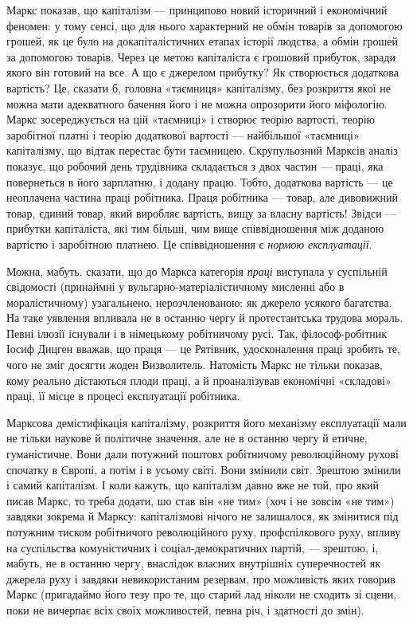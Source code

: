 Маркс показав, що капіталізм — принципово новий історичний і 
економічний феномен: у тому сенсі, що для нього характерний не обмін 
товарів за допомогою грошей, як це було на докапіталістичних етапах 
історії людства, а обмін грошей за допомогою товарів. Через це метою 
капіталіста є грошовий прибуток, заради якого він готовий на все. А що 
є джерелом прибутку? Як створюється додаткова вартість? Це, сказати б, 
головна «таємниця» капіталізму, без розкриття якої не можна мати 
адекватного бачення його і не можна опрозорити його міфологію. Маркс 
зосереджується на цій «таємниці» і створює теорію вартості, теорію 
заробітної платні і теорію додаткової вартості — найбільшої 
«таємниці» капіталізму, що відтак перестає бути таємницею. 
Скрупульозний Марксів аналіз показує, що робочий день трудівника 
складається з двох частин — праці, яка повернеться в його зарплатню, і 
додану працю. Тобто, додаткова вартість — це неоплачена частина праці 
робітника. Праця робітника — товар, але дивовижний товар, єдиний 
товар, який виробляє вартість, вищу за власну вартість! Звідси — 
прибутки капіталіста, які тим більші, чим вище співвідношення між 
доданою вартістю і заробітною платнею. Це співвідношення є 
\emph{нормою}\emph{ }\emph{експлуатації}.


Можна, мабуть. сказати, що до Маркса категорія \emph{праці} виступала у 
суспільній свідомості (принаймні у вульгарно-матеріалістичному 
мисленні або в моралістичному) узагальнено, нерозчленованою: як 
джерело усякого багатства. На таке уявлення впливала не в останню 
чергу й протестантська трудова мораль. Певні ілюзії існували і в 
німецькому робітничому русі. Так, філософ-робітник Іосиф Дицген 
вважав, що праця — це Рятівник, удосконалення праці зробить те, чого не 
зміг досягти жоден Визволитель. Натомість Маркс не тільки показав, 
кому реально дістаються плоди праці, а й проаналізував економічні 
«складові» праці, її місце в процесі експлуатації робітника. 


Марксова демістифікація капіталізму, розкриття його механізму 
експлуатації мали не тільки наукове й політичне значення, але не в 
останню чергу й етичне, гуманістичне. Вони дали потужний поштовх 
робітничому революційному рухові спочатку в Європі, а потім і в усьому 
світі. Вони змінили світ. Зрештою змінили і самий капіталізм. І коли 
кажуть, що капіталізм давно вже не той, про який писав Маркс, то треба 
додати, шо став він «не тим» (хоч і не зовсім «не тим») завдяки зокрема й 
Марксу: капіталізмові нічого не залишалося, як змінитися під потужним 
тиском робітничого революційного руху, профспілкового руху, впливу на 
суспільства комуністичних і соціал-демократичних партій, — зрештою, 
і, мабуть, не в останню чергу, внаслідок власних внутрішніх 
суперечностей як джерела руху і завдяки невикористаним резервам, про 
можливість яких говорив Маркс (пригадаймо його тезу про те, що старий 
лад ніколи не сходить зі сцени, поки не вичерпає всіх своїх 
можливостей, певна річ, і здатності до змін).



